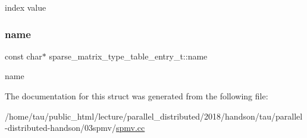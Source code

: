 index value \mbox{\label{structsparse__matrix__type__table__entry__t_a7e2dea3171064e4ffece2e2c8a88c9ce}} 
\subsubsection{\texorpdfstring{name}{name}}
{\footnotesize\ttfamily const char$\ast$ sparse\+\_\+matrix\+\_\+type\+\_\+table\+\_\+entry\+\_\+t\+::name}

name 

The documentation for this struct was generated from the following file\+:\begin{DoxyCompactItemize}
\item 
/home/tau/public\+\_\+html/lecture/parallel\+\_\+distributed/2018/handson/tau/parallel-\/distributed-\/handson/03spmv/\hyperlink{spmv_8cc}{spmv.\+cc}\end{DoxyCompactItemize}
